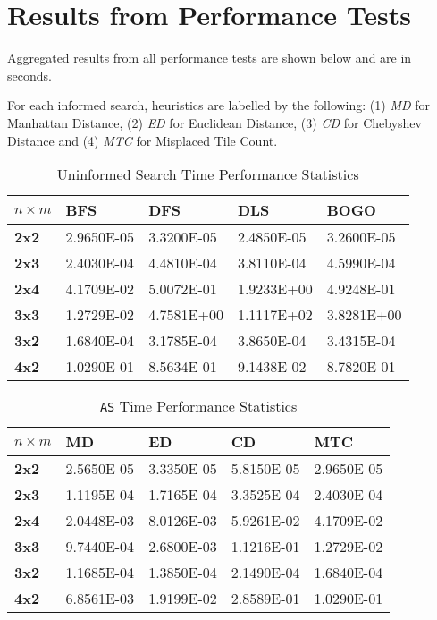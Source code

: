 \section{Results from Performance Tests}
\label{sec:Results from Performance Tests}

Aggregated results from all performance tests are shown below and are in seconds.

For each informed search, heuristics
are labelled by the following: (1) \emph{MD} for Manhattan Distance, (2)
\emph{ED} for Euclidean Distance, (3) \emph{CD} for Chebyshev Distance and
(4) \emph{MTC} for Misplaced Tile Count.

\newcommand\nm { $n \times m$ }

\begin{table}[h!]
\centering
\caption{Uninformed Search Time Performance Statistics}
\label{tab:uninformed}
\begin{tabular}{|l|l|l|l|l|}
\hline
\textbf{\nm} & \textbf{BFS} & \textbf{DFS} & \textbf{DLS} & \textbf{BOGO} \\ \hline \hline
\textbf{2x2} & 2.9650E-05   & 3.3200E-05   & 2.4850E-05   & 3.2600E-05    \\ \hline
\textbf{2x3} & 2.4030E-04   & 4.4810E-04   & 3.8110E-04   & 4.5990E-04    \\ \hline
\textbf{2x4} & 4.1709E-02   & 5.0072E-01   & 1.9233E+00   & 4.9248E-01    \\ \hline
\textbf{3x3} & 1.2729E-02   & 4.7581E+00   & 1.1117E+02   & 3.8281E+00    \\ \hline
\textbf{3x2} & 1.6840E-04   & 3.1785E-04   & 3.8650E-04   & 3.4315E-04    \\ \hline
\textbf{4x2} & 1.0290E-01   & 8.5634E-01   & 9.1438E-02   & 8.7820E-01    \\ \hline
\end{tabular}
\end{table}

\begin{table}[h!]
\centering
\caption{\texttt{AS} Time Performance Statistics}
\label{tab:as}
\begin{tabular}{|l|l|l|l|l|}
\hline
\textbf{\nm} & \textbf{MD} & \textbf{ED} & \textbf{CD} & \textbf{MTC} \\ \hline \hline
\textbf{2x2} & 2.5650E-05  & 3.3350E-05  & 5.8150E-05  & 2.9650E-05   \\ \hline
\textbf{2x3} & 1.1195E-04  & 1.7165E-04  & 3.3525E-04  & 2.4030E-04   \\ \hline
\textbf{2x4} & 2.0448E-03  & 8.0126E-03  & 5.9261E-02  & 4.1709E-02   \\ \hline
\textbf{3x3} & 9.7440E-04  & 2.6800E-03  & 1.1216E-01  & 1.2729E-02   \\ \hline
\textbf{3x2} & 1.1685E-04  & 1.3850E-04  & 2.1490E-04  & 1.6840E-04   \\ \hline
\textbf{4x2} & 6.8561E-03  & 1.9199E-02  & 2.8589E-01  & 1.0290E-01   \\ \hline
\end{tabular}
\end{table}

